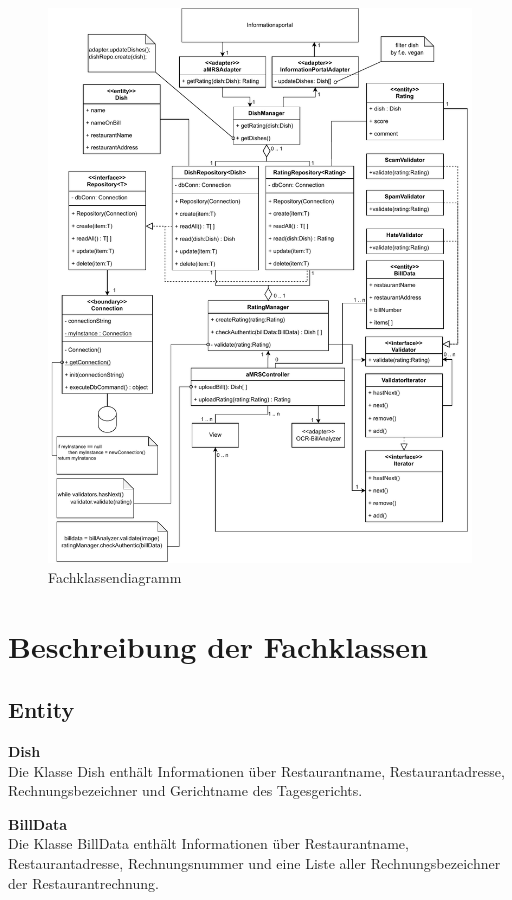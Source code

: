 \begin{figure}[H]
    \centering
    \caption{Fachklassendiagramm} \label{fig:Fachklassendiagramm}
    \includegraphics[width=\textwidth,keepaspectratio]{images/Fachklassenmodell}
\end{figure}

\section*{Beschreibung der Fachklassen}

\subsection*{Entity}
\textbf{Dish} \\
Die Klasse Dish enthält Informationen über Restaurantname, Restaurantadresse, Rechnungsbezeichner und Gerichtname des
Tagesgerichts.
\newline

\noindent \textbf{BillData} \\
Die Klasse BillData enthält Informationen über Restaurantname, Restaurantadresse, Rechnungsnummer und eine Liste aller
Rechnungsbezeichner der Restaurantrechnung.
\newline

